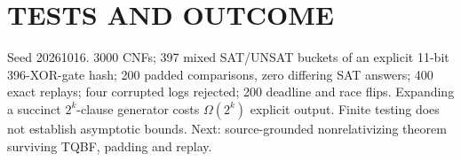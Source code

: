 \documentclass{article}
\begin{document}
\section{TESTS AND OUTCOME}
Seed 20261016. 3000 CNFs; 397 mixed SAT/UNSAT buckets of an explicit 11-bit 396-XOR-gate hash; 200 padded comparisons, zero differing SAT answers; 400 exact replays; four corrupted logs rejected; 200 deadline and race flips. Expanding a succinct $2^k$-clause generator costs $\Omega(2^k)$ explicit output. Finite testing does not establish asymptotic bounds. Next: source-grounded nonrelativizing theorem surviving TQBF, padding and replay.
\end{document}
